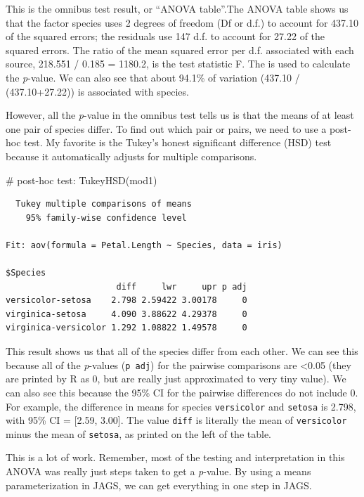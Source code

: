 \documentclass[
  13,
  letterpaper,
]{report}
\newenvironment{Shaded}{\begin{snugshade}}{\end{snugshade}}
\newcommand{\CommentTok}[1]{\textcolor[rgb]{0.37,0.37,0.37}{#1}}
\newcommand{\FunctionTok}[1]{\textcolor[rgb]{0.28,0.35,0.67}{#1}}
\newcommand{\NormalTok}[1]{\textcolor[rgb]{0.00,0.23,0.31}{#1}}
\begin{document}
This is the omnibus test result, or ``ANOVA table''.The ANOVA table
shows us that the factor species uses 2 degrees of freedom (Df or d.f.)
to account for 437.10 of the squared errors; the residuals use 147 d.f.
to account for 27.22 of the squared errors. The ratio of the mean
squared error per d.f. associated with each source, 218.551 / 0.185 =
1180.2, is the test statistic F. The is used to calculate the
\emph{p}-value. We can also see that about 94.1\% of variation (437.10 /
(437.10+27.22)) is associated with species.

However, all the \emph{p}-value in the omnibus test tells us is that the
means of at least one pair of species differ. To find out which pair or
pairs, we need to use a post-hoc test. My favorite is the Tukey's honest
significant difference (HSD) test because it automatically adjusts for
multiple comparisons.

\begin{Shaded}
\begin{Highlighting}[]
\CommentTok{\# post{-}hoc test:}
\FunctionTok{TukeyHSD}\NormalTok{(mod1)}
\end{Highlighting}
\end{Shaded}

\begin{verbatim}
  Tukey multiple comparisons of means
    95% family-wise confidence level

Fit: aov(formula = Petal.Length ~ Species, data = iris)

$Species
                      diff     lwr     upr p adj
versicolor-setosa    2.798 2.59422 3.00178     0
virginica-setosa     4.090 3.88622 4.29378     0
virginica-versicolor 1.292 1.08822 1.49578     0
\end{verbatim}

This result shows us that all of the species differ from each other. We
can see this because all of the \emph{p}-values (\texttt{p\ adj}) for
the pairwise comparisons are \textless0.05 (they are printed by R as 0,
but are really just approximated to very tiny value). We can also see
this because the 95\% CI for the pairwise differences do not include 0.
For example, the difference in means for species \texttt{versicolor} and
\texttt{setosa} is 2.798, with 95\% CI = {[}2.59, 3.00{]}. The value
\texttt{diff} is literally the mean of \texttt{versicolor} minus the
mean of \texttt{setosa}, as printed on the left of the table.

This is a lot of work. Remember, most of the testing and interpretation
in this ANOVA was really just steps taken to get a \emph{p}-value. By
using a means parameterization in JAGS, we can get everything in one
step in JAGS.
\end{document}

